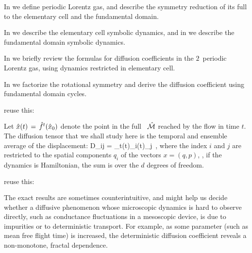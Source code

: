 In  we define periodic Lorentz gas, and describe the
symmetry reduction of its full {\statesp} to the elementary
cell and the fundamental domain.

In  we describe the elementary cell symbolic dynamics,
and in
 we describe the fundamental domain symbolic dynamics.




In 
we briefly review the formulas for diffusion
coefficients in the $2$\dmn\ periodic Lorentz gas, using dynamics
restricted in elementary cell.

In  we
factorize the rotational symmetry and derive the diffusion coefficient
using fundamental domain cycles.

     {
reuse this:

Let $\hat x(t)\,=\,{\hat{f}^{t}(\hat x_0)}$ denote the point in the full
\statesp\ $\hat {{\cal M}}$ reached by the flow in time $t$. The diffusion tensor
that we shall study here
is the temporal and ensemble average of the displacement: \beq D_{ij}
=
\lim_{t\to\infty}\left\langle\hx(t)_i\hx(t)_j\right\rangle
 \,, \label{eq-diff-def} \eeq where the index $i$ and $j$ are
restricted to the spatial components $q_i$ of the {\statesp} vectors
$x=(q,p)$, \ie, if the dynamics is Hamiltonian, the sum is over the
$d$ degrees of freedom.
    }
     {
reuse this:

The exact results are sometimes counterintuitive, and might help us
decide whether a diffusive phenomenon whose microscopic dynamics is hard
to observe directly, such as conductance fluctuations in a mesoscopic
device, is due to impurities or to deterministic transport. For example,
as some parameter (such as mean free flight time) is increased, the
deterministic diffusion coefficient reveals a non-monotone, fractal
dependence.
    }
